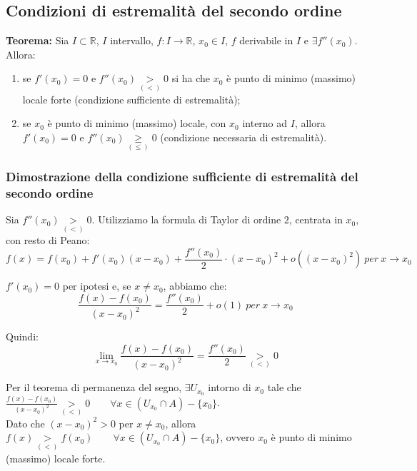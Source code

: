\documentclass{article}
\begin{document}
\subsection{Condizioni di estremalità del secondo ordine}
\textbf{Teorema: } Sia $I \subset \mathbb{R}$, $I$ intervallo, $f: I \xrightarrow{} \mathbb{R}$, $x_0 \in I$, $f$ derivabile in $I$ e $\exists f''(x_0)$. Allora:
\begin{enumerate}[label=\alph*)]
    \item se $f'(x_0) = 0$ e $f''(x_0) \underset{(<)}{>} 0$ si ha che $x_0$ è punto di minimo (massimo) locale forte (condizione sufficiente di estremalità);
    \item se $x_0$ è punto di minimo (massimo) locale, con $x_0$ interno ad $I$, allora $f'(x_0) = 0$ e $f''(x_0) \underset{(\leq)}{\geq} 0$ (condizione necessaria di estremalità).
\end{enumerate}

\subsubsection{Dimostrazione della condizione sufficiente di estremalità del secondo ordine}
Sia $f''(x_0) \underset{(<)}{>} 0$. Utilizziamo la formula di Taylor di ordine $2$, centrata in $x_0$, con resto di Peano:
\begin{equation*}
    f(x) = f(x_0) + f'(x_0)(x - x_0) + \frac{f''(x_0)}{2} \cdot (x - x_0)^2 + o((x - x_0)^2) \ per \ x \to x_0
\end{equation*}

\noindent $f'(x_0) = 0$ per ipotesi e, se $x \neq x_0$, abbiamo che:
\begin{equation*}
    \frac{f(x) - f(x_0)}{(x - x_0)^2} =  \frac{f''(x_0)}{2} + o(1) \ per \ x \to x_0
\end{equation*}

\noindent Quindi:
\begin{equation*}
    \lim_{x \to x_0} \frac{f(x) - f(x_0)}{(x - x_0)^2} = \frac{f''(x_0)}{2} \underset{(<)}{>} 0
\end{equation*}

\noindent Per il teorema di permanenza del segno, $\exists U_{x_0}$ intorno di $x_0$ tale che $\frac{f(x) - f(x_0)}{(x - x_0)^2} \underset{(<)}{>} 0 \qquad \forall x \in (U_{x_0} \cap A) - \{x_0\}$. \\
Dato che $(x - x_0)^2 > 0$ per $x \neq x_0$, allora $f(x) \underset{(<)}{>} f(x_0) \qquad \forall x \in (U_{x_0} \cap A) - \{x_0\}$, ovvero $x_0$ è punto di minimo (massimo) locale forte.
\end{document}
